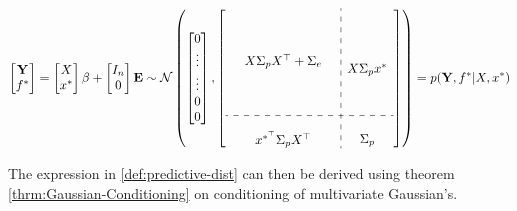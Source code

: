 \begin{gather}
    \begin{bmatrix}
        \mathbf{Y} \\
        f^{\ast}
    \end{bmatrix}
    = \begin{bmatrix} X \\ x^{\ast} \end{bmatrix} \beta + \begin{bmatrix} I_n \\ 0 \end{bmatrix}  \mathbf{E}
    \sim \N \left(
        \begin{bmatrix}
        0 \\
        \vdots \\
        \vdots \\
        0 \\
        0
        \end{bmatrix},
        \left[
        \begin{array}{ c:c c c }
            \begin{matrix}
                & & \\
                & & \\
                & & \\
                & X \Sigma_p X^{\top} + \Sigma_e & \\
                & & \\
                & & \\
                & & \\
            \end{matrix}
            & \begin{matrix} \\ \\ \\ X \Sigma_p x^{\ast} \\ \\ \\ \end{matrix} \\
            \hdashline \\
            \begin{matrix} &  x^{\ast^{\top}}  \Sigma_p X^{\top} & \end{matrix} & \Sigma_p
        \end{array}
        \right]
        \right)
    = p(\mathbf{Y}, f^{\ast}| X, x^{\ast})
\end{gather}

The expression in \ref{def:predictive-dist} can then be derived using theorem \ref{thrm:Gaussian-Conditioning} on
conditioning of multivariate Gaussian's.

